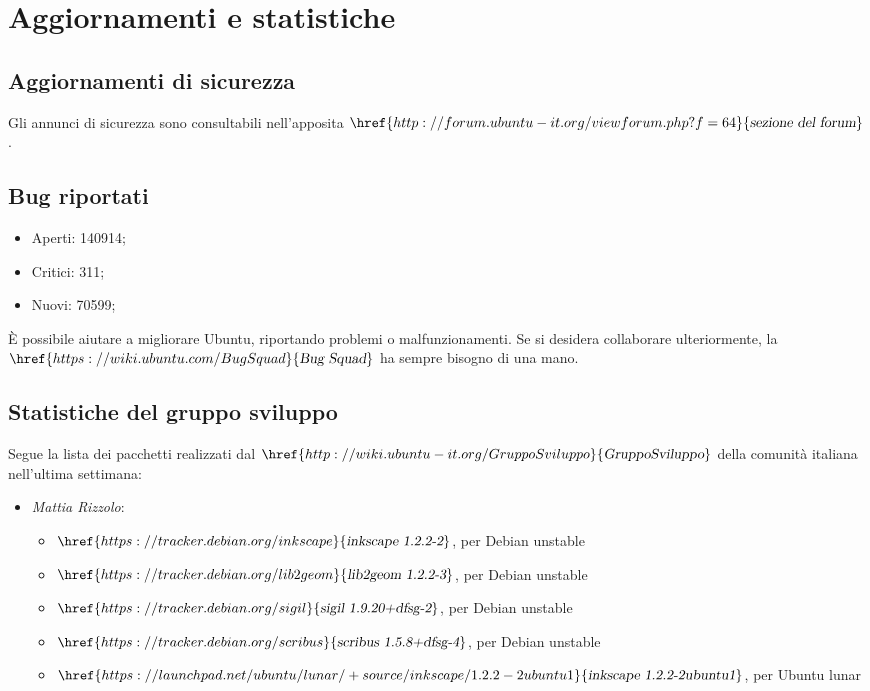 \documentclass[a4paper,twoside]{article}
\begin{document}
\section{Aggiornamenti e statistiche}
\subsection{Aggiornamenti di sicurezza}
Gli annunci di sicurezza sono consultabili nell'apposita $\href{http://forum.ubuntu-it.org/viewforum.php?f=64}{\textsl{sezione del forum}}$.

\subsection{Bug riportati}

\begin{itemize}
\item Aperti: 140914; 
\item Critici: 311;
\item Nuovi: 70599;
\end{itemize}

È possibile aiutare a migliorare Ubuntu, riportando problemi o malfunzionamenti. Se si desidera collaborare ulteriormente, la $\href{https://wiki.ubuntu.com/BugSquad}{\textsl{Bug Squad}}$ ha sempre bisogno di una mano.

\subsection{Statistiche del gruppo sviluppo}
Segue la lista dei pacchetti realizzati dal $\href{http://wiki.ubuntu-it.org/GruppoSviluppo}{\textsl{GruppoSviluppo}}$ della comunità italiana nell'ultima settimana:

\begin{itemize}
\item \textit{Mattia Rizzolo}:
\begin{itemize}
\item $\href{https://tracker.debian.org/inkscape}{\textsl{inkscape 1.2.2-2}}$, per Debian unstable
\item $\href{https://tracker.debian.org/lib2geom}{\textsl{lib2geom 1.2.2-3}}$, per Debian unstable
\item $\href{https://tracker.debian.org/sigil}{\textsl{sigil 1.9.20+dfsg-2}}$, per Debian unstable
\item $\href{https://tracker.debian.org/scribus}{\textsl{scribus 1.5.8+dfsg-4}}$, per Debian unstable
\item $\href{https://launchpad.net/ubuntu/lunar/+source/inkscape/1.2.2-2ubuntu1}{\textsl{inkscape 1.2.2-2ubuntu1}}$, per Ubuntu lunar
\end{itemize}
\end{itemize}
\end{document}

